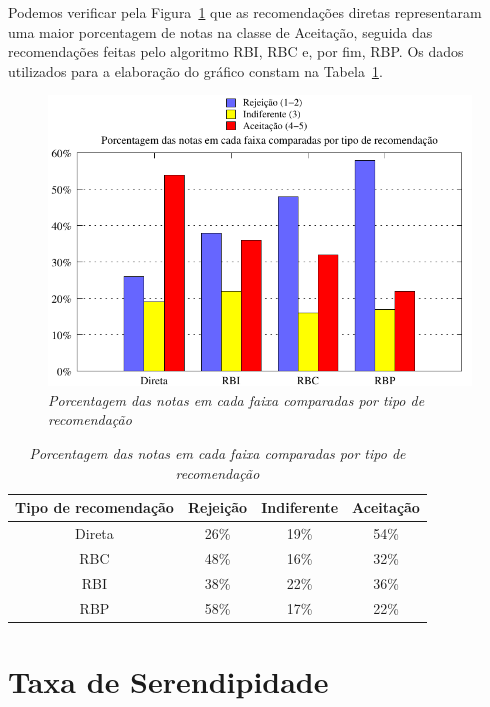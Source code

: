  Podemos verificar pela Figura~\ref{fig:notas} que as recomendações diretas representaram uma maior porcentagem de notas na classe de Aceitação, seguida das recomendações feitas pelo algoritmo RBI, RBC e, por fim, RBP. Os dados utilizados para a elaboração do gráfico constam na Tabela~\ref{table:notas}.
 
\begin{figure}
    \centering
    \includegraphics[width=\textwidth]{imagens/grafico_notas}
    \caption{\it Porcentagem das notas em cada faixa comparadas por tipo de recomendação}
    \label{fig:notas}
\end{figure}

\begin{table}
\centering
\begin{tabular}{c c c c} 
    \hline \hline
    \textbf{Tipo de recomendação} & \textbf{Rejeição}& \textbf{Indiferente}& \textbf{Aceitação} \\
\hline 
Direta & 26\% & 19\% & 54\% \\
\hline 
RBC & 48\% & 16\% & 32\% \\
\hline 
RBI & 38\% & 22\% & 36\% \\
\hline 
RBP & 58\% & 17\% & 22\% \\
\hline        
\end{tabular}
\caption{\it Porcentagem das notas em cada faixa comparadas por tipo de recomendação}
\label{table:notas}
\end{table}


\section{Taxa de Serendipidade}
\label{sec:taxa_de_serendipidade}

